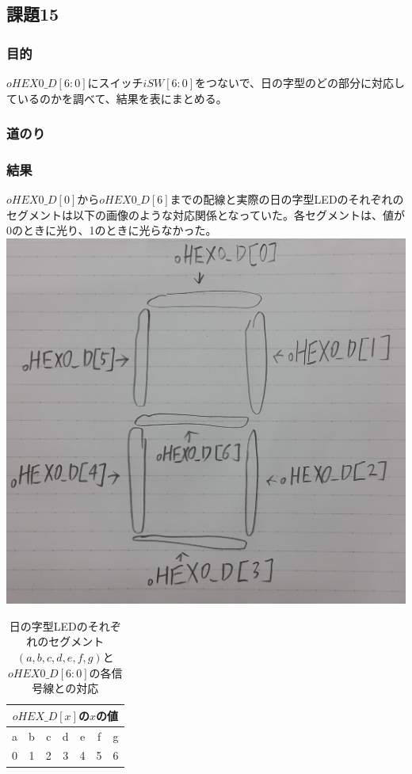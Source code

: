 \documentclass[a4paper]{jarticle}
\begin{document}
\subsection{課題15}
\subsubsection{目的}
$oHEX0\_D[6:0]$にスイッチ$iSW[6:0]$をつないで、日の字型のどの部分に対応しているのかを調べて、結果を表にまとめる。
\subsubsection{道のり}
\subsubsection{結果}
$oHEX0\_D[0]$から$oHEX0\_D[6]$までの配線と実際の日の字型LEDのそれぞれのセグメントは以下の画像のような対応関係となっていた。各セグメントは、値が0のときに光り、1のときに光らなかった。\\
\includegraphics[width=15cm]{work15/SevenSegmentDisplay.jpg}
\begin{table}[H]
	\begin{center}
		\caption{日の字型LEDのそれぞれのセグメント$ \left( a,b,c,d,e,f,g \right) $と$oHEX0\_D[6:0]$の各信号線との対応}
		\label{Work15Table}
		\begin{tabular}{|c|c|c|c|c|c|c|}
			\hline
			\multicolumn{7}{|c|}{$oHEX\_D[x]$の$x$の値}\\		\hline
			a	&b	&c	&d	&e	&f	&g\\	\hline
			0	&1	&2	&3	&4	&5	&6\\	\hline
		\end{tabular}
	\end{center}
\end{table}
\end{document}
